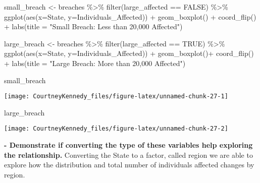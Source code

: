 \documentclass[
]{article}
\newenvironment{Shaded}{\begin{snugshade}}{\end{snugshade}}
\newcommand{\AttributeTok}[1]{\textcolor[rgb]{0.77,0.63,0.00}{#1}}
\newcommand{\ConstantTok}[1]{\textcolor[rgb]{0.00,0.00,0.00}{#1}}
\newcommand{\FunctionTok}[1]{\textcolor[rgb]{0.00,0.00,0.00}{#1}}
\newcommand{\NormalTok}[1]{#1}
\newcommand{\OtherTok}[1]{\textcolor[rgb]{0.56,0.35,0.01}{#1}}
\newcommand{\SpecialCharTok}[1]{\textcolor[rgb]{0.00,0.00,0.00}{#1}}
\newcommand{\StringTok}[1]{\textcolor[rgb]{0.31,0.60,0.02}{#1}}
\begin{document}
\begin{Shaded}
\begin{Highlighting}[]
\NormalTok{small\_breach }\OtherTok{\textless{}{-}}\NormalTok{ breaches }\SpecialCharTok{\%\textgreater{}\%}
  \FunctionTok{filter}\NormalTok{(large\_affected }\SpecialCharTok{==} \ConstantTok{FALSE}\NormalTok{) }\SpecialCharTok{\%\textgreater{}\%}
  \FunctionTok{ggplot}\NormalTok{(}\FunctionTok{aes}\NormalTok{(}\AttributeTok{x=}\NormalTok{State, }\AttributeTok{y=}\NormalTok{Individuals\_Affected)) }\SpecialCharTok{+}
  \FunctionTok{geom\_boxplot}\NormalTok{() }\SpecialCharTok{+}
  \FunctionTok{coord\_flip}\NormalTok{() }\SpecialCharTok{+}
  \FunctionTok{labs}\NormalTok{(}\AttributeTok{title =} \StringTok{"Small Breach: Less than 20,000 Affected"}\NormalTok{)}

\NormalTok{large\_breach }\OtherTok{\textless{}{-}}\NormalTok{ breaches }\SpecialCharTok{\%\textgreater{}\%}
  \FunctionTok{filter}\NormalTok{(large\_affected }\SpecialCharTok{==} \ConstantTok{TRUE}\NormalTok{) }\SpecialCharTok{\%\textgreater{}\%}
  \FunctionTok{ggplot}\NormalTok{(}\FunctionTok{aes}\NormalTok{(}\AttributeTok{x=}\NormalTok{State, }\AttributeTok{y=}\NormalTok{Individuals\_Affected)) }\SpecialCharTok{+}
  \FunctionTok{geom\_boxplot}\NormalTok{()}\SpecialCharTok{+}
  \FunctionTok{coord\_flip}\NormalTok{() }\SpecialCharTok{+}
  \FunctionTok{labs}\NormalTok{(}\AttributeTok{title =} \StringTok{"Large Breach: More than 20,000 Affected"}\NormalTok{)}

\NormalTok{small\_breach}
\end{Highlighting}
\end{Shaded}

\begin{center}\texttt{[image: CourtneyKennedy\_files/figure-latex/unnamed-chunk-27-1]} \end{center}

\begin{Shaded}
\begin{Highlighting}[]
\NormalTok{large\_breach}
\end{Highlighting}
\end{Shaded}

\begin{center}\texttt{[image: CourtneyKennedy\_files/figure-latex/unnamed-chunk-27-2]} \end{center}

\textbf{- Demonstrate if converting the type of these variables help
exploring the relationship.} Converting the State to a factor, called
region we are able to explore how the distribution and total number of
individuals affected changes by region.
\end{document}
